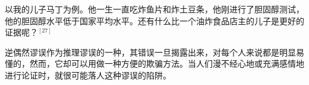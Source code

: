 \begin{displayquote}
以我的儿子马丁为例。他一生一直吃炸鱼片和炸土豆条，他刚进行了胆固醇测试，他的胆固醇水平低于国家平均水平。还有什么比一个油炸食品店主的儿子是更好的证据呢？${ }^{[27]}$
\end{displayquote}

逆偶然谬误作为推理谬误的一种，其错误一旦揭露出来，对每个人来说都是明显易懂的，然而，它却可以用做一种方便的欺骗方法。当人们漫不经心地或充满感情地进行论证时，就很可能落人这种谬误的陷阱。

